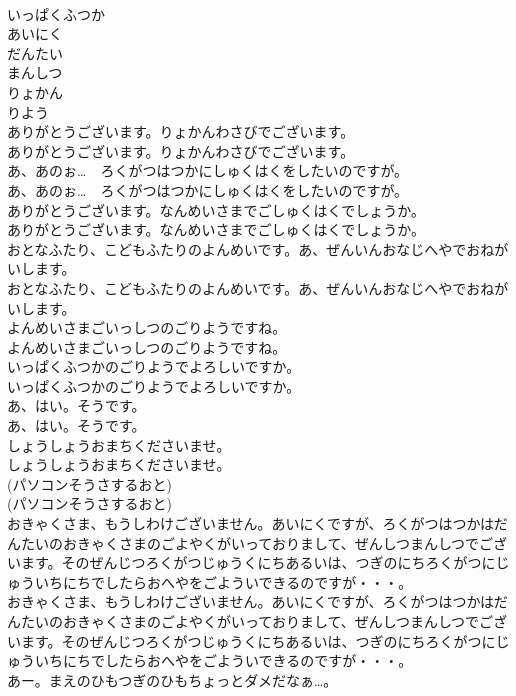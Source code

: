 \documentclass[8pt]{extreport}
\begin{document}
\begin{CJK}{UTF8}{min}
\\	いっぱくふつか
\\	あいにく
\\	だんたい
\\	まんしつ
\\	りょかん
\\	りよう
\\	ありがとうございます。りょかんわさびでございます。	
\\	ありがとうございます。りょかんわさびでございます。 
\\	あ、あのぉ…　ろくがつはつかにしゅくはくをしたいのですが。	
\\	あ、あのぉ…　ろくがつはつかにしゅくはくをしたいのですが。 
\\	ありがとうございます。なんめいさまでごしゅくはくでしょうか。	
\\	ありがとうございます。なんめいさまでごしゅくはくでしょうか。 
\\	おとなふたり、こどもふたりのよんめいです。あ、ぜんいんおなじへやでおねがいします。	
\\	おとなふたり、こどもふたりのよんめいです。あ、ぜんいんおなじへやでおねがいします。 
\\	よんめいさまごいっしつのごりようですね。	
\\	よんめいさまごいっしつのごりようですね。 
\\	いっぱくふつかのごりようでよろしいですか。	
\\	いっぱくふつかのごりようでよろしいですか。 
\\	あ、はい。そうです。	
\\	あ、はい。そうです。 
\\	しょうしょうおまちくださいませ。	
\\	しょうしょうおまちくださいませ。 
\\	(パソコンそうさするおと)	
\\	(パソコンそうさするおと) 
\\	おきゃくさま、もうしわけございません。あいにくですが、ろくがつはつかはだんたいのおきゃくさまのごよやくがいっておりまして、ぜんしつまんしつでございます。そのぜんじつろくがつじゅうくにちあるいは、つぎのにちろくがつにじゅういちにちでしたらおへやをごよういできるのですが・・・。	
\\	おきゃくさま、もうしわけございません。あいにくですが、ろくがつはつかはだんたいのおきゃくさまのごよやくがいっておりまして、ぜんしつまんしつでございます。そのぜんじつろくがつじゅうくにちあるいは、つぎのにちろくがつにじゅういちにちでしたらおへやをごよういできるのですが・・・。 
\\	あー。まえのひもつぎのひもちょっとダメだなぁ…。	

\end{CJK}
\end{document}
